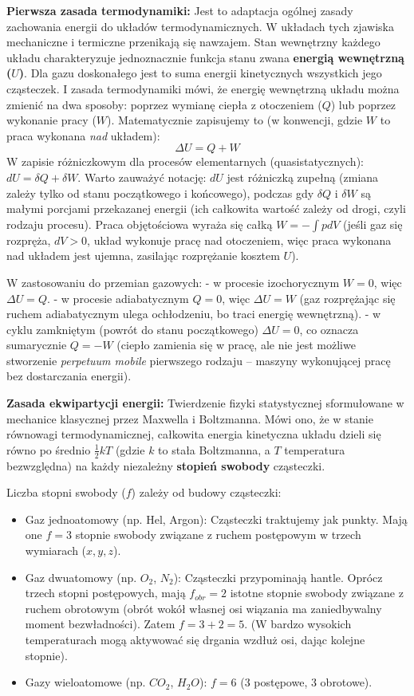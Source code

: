 \documentclass[11pt, a4paper]{article}
\begin{document}
\textbf{Pierwsza zasada termodynamiki:}
Jest to adaptacja ogólnej zasady zachowania energii do układów termodynamicznych. W układach tych zjawiska mechaniczne i termiczne przenikają się nawzajem. Stan wewnętrzny każdego układu charakteryzuje jednoznacznie funkcja stanu zwana \textbf{energią wewnętrzną ($U$)}. Dla gazu doskonałego jest to suma energii kinetycznych wszystkich jego cząsteczek.
I zasada termodynamiki mówi, że energię wewnętrzną układu można zmienić na dwa sposoby: poprzez wymianę ciepła z otoczeniem ($Q$) lub poprzez wykonanie pracy ($W$). Matematycznie zapisujemy to (w konwencji, gdzie $W$ to praca wykonana \textit{nad} układem):
\[
\Delta U = Q + W
\]
W zapisie różniczkowym dla procesów elementarnych (quasistatycznych): $dU = \delta Q + \delta W$. Warto zauważyć notację: $dU$ jest różniczką zupełną (zmiana zależy tylko od stanu początkowego i końcowego), podczas gdy $\delta Q$ i $\delta W$ są małymi porcjami przekazanej energii (ich całkowita wartość zależy od drogi, czyli rodzaju procesu). Praca objętościowa wyraża się całką $W = -\int p dV$ (jeśli gaz się rozpręża, $dV > 0$, układ wykonuje pracę nad otoczeniem, więc praca wykonana nad układem jest ujemna, zasilając rozprężanie kosztem $U$).

W zastosowaniu do przemian gazowych:
- w procesie izochorycznym $W=0$, więc $\Delta U = Q$.
- w procesie adiabatycznym $Q=0$, więc $\Delta U = W$ (gaz rozprężając się ruchem adiabatycznym ulega ochłodzeniu, bo traci energię wewnętrzną).
- w cyklu zamkniętym (powrót do stanu początkowego) $\Delta U = 0$, co oznacza sumarycznie $Q = -W$ (ciepło zamienia się w pracę, ale nie jest możliwe stworzenie \textit{perpetuum mobile} pierwszego rodzaju – maszyny wykonującej pracę bez dostarczania energii).

\textbf{Zasada ekwipartycji energii:}
Twierdzenie fizyki statystycznej sformułowane w mechanice klasycznej przez Maxwella i Boltzmanna. Mówi ono, że w stanie równowagi termodynamicznej, całkowita energia kinetyczna układu dzieli się równo po średnio $\frac{1}{2}kT$ (gdzie $k$ to stała Boltzmanna, a $T$ temperatura bezwzględna) na każdy niezależny \textbf{stopień swobody} cząsteczki.

Liczba stopni swobody ($f$) zależy od budowy cząsteczki:
\begin{itemize}
    \item Gaz jednoatomowy (np. Hel, Argon): Cząsteczki traktujemy jak punkty. Mają one $f=3$ stopnie swobody związane z ruchem postępowym w trzech wymiarach ($x, y, z$).
    \item Gaz dwuatomowy (np. $O_2$, $N_2$): Cząsteczki przypominają hantle. Oprócz trzech stopni postępowych, mają $f_{obr}=2$ istotne stopnie swobody związane z ruchem obrotowym (obrót wokół własnej osi wiązania ma zaniedbywalny moment bezwładności). Zatem $f = 3 + 2 = 5$. (W bardzo wysokich temperaturach mogą aktywować się drgania wzdłuż osi, dając kolejne stopnie).
    \item Gazy wieloatomowe (np. $CO_2$, $H_2O$): $f=6$ (3 postępowe, 3 obrotowe).
\end{itemize}
\end{document}
